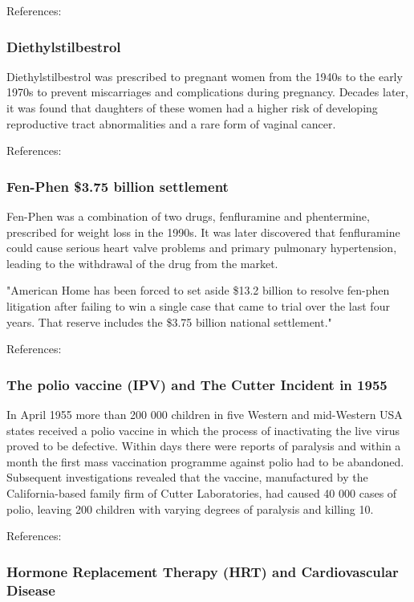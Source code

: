 References: \cite{WGMcbride}

\subsubsection{Diethylstilbestrol}
Diethylstilbestrol was prescribed to pregnant women from the 1940s to the early 1970s to prevent miscarriages and complications during pregnancy. Decades later, it was found that daughters of these women had a higher risk of developing reproductive tract abnormalities and a rare form of vaginal cancer.

References: \cite{Diethylstilbestrol2000}

\subsubsection{Fen-Phen \$3.75 billion settlement}
Fen-Phen was a combination of two drugs, fenfluramine and phentermine, prescribed for weight loss in the 1990s. It was later discovered that fenfluramine could cause serious heart valve problems and primary pulmonary hypertension, leading to the withdrawal of the drug from the market.

"American Home has been forced to set aside \$13.2 billion to resolve fen-phen litigation after failing to win a single case that came to trial over the last four years. That reserve includes the \$3.75 billion national settlement." \cite{FenPhenNYT2002}

References: \cite{Wolff1997}

\subsubsection{The polio vaccine (IPV) and The Cutter Incident in 1955}

In April 1955 more than 200 000 children in five Western and mid-Western USA states received a polio vaccine in which the process of inactivating the live virus proved to be defective. Within days there were reports of paralysis and within a month the first mass vaccination programme against polio had to be abandoned. Subsequent investigations revealed that the vaccine, manufactured by the California-based family firm of Cutter Laboratories, had caused 40 000 cases of polio, leaving 200 children with varying degrees of paralysis and killing 10.

References: \cite{Fitzpatrick2006}

\subsubsection{Hormone Replacement Therapy (HRT) and Cardiovascular Disease}

